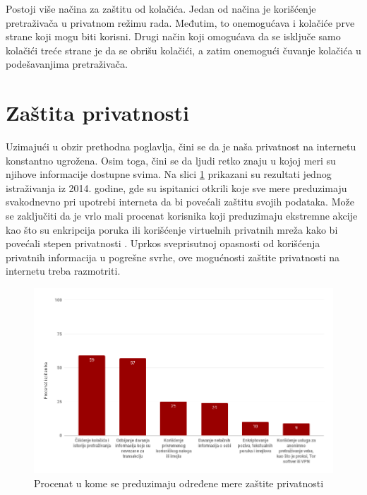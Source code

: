 \documentclass[a4paper]{article}
\begin{document}
\par Postoji više načina za zaštitu od kolačića. Jedan od načina je korišćenje pretraživača u privatnom režimu rada. Međutim, to onemogućava i kolačiće prve strane koji mogu biti korisni. Drugi način koji omogućava da se isključe samo kolačići treće strane je da se obrišu kolačići, a zatim onemogući čuvanje kolačića u podešavanjima pretraživača. 

\section{Zaštita privatnosti}
\label{sec:zastita}
Uzimajući u obzir prethodna poglavlja, čini se da je naša privatnost na internetu konstantno ugrožena. Osim toga, čini se da ljudi retko znaju u kojoj meri su njihove informacije dostupne svima.  Na slici \ref{fig:slika1} prikazani su rezultati jednog istraživanja iz 2014. godine, gde su ispitanici otkrili koje sve mere preduzimaju svakodnevno pri upotrebi interneta da bi povećali zaštitu svojih podataka. Može se zaključiti da je vrlo mali procenat korisnika koji preduzimaju ekstremne akcije kao što su enkripcija poruka ili korišćenje virtuelnih privatnih mreža kako bi povećali stepen privatnosti \cite{stat}. Uprkos sveprisutnoj opasnosti od korišćenja privatnih informacija u pogrešne svrhe, ove mogućnosti zaštite privatnosti na internetu treba razmotriti.


\begin{figure}[h!]
	\begin{center}
		\includegraphics[scale=0.35]{chart.png}
	\end{center}
	\caption{Procenat u kome se preduzimaju određene mere zaštite privatnosti}
	\label{fig:slika1}
\end{figure}
\end{document}

